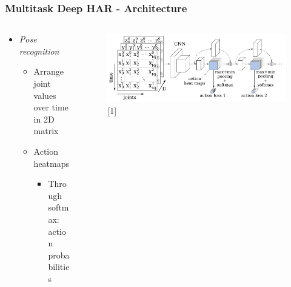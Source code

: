 \documentclass[9pt]{beamer}
\providecommand{\sourcefix}[1]{\\ \footnotesize \tugreen{Source:} [#1]}
\newenvironment{myframe}[1][]{%
\begin{frame}%
\frametitle{#1}
\setcounter{footnote}{0}


}{%
\end{frame}%
}
\begin{document}
\begin{myframe}[Multitask Deep HAR - Architecture]

	\begin{columns}[T]
        \begin{column}{.45\textwidth}
            \begin{itemize}
                \item \textit{Pose recognition}
                \begin{itemize}
                    \item Arrange joint values over time in 2D matrix
                    \item Action heatmaps
                    \begin{itemize}
                        \item Through softmax: action probabilities
                    \end{itemize}

                \end{itemize}
            \end{itemize}
        \end{column}
        \begin{column}{.45\textwidth}
            \begin{figure}
                \includegraphics[width=.99\textwidth]{jointsovertime.png}
                \sourcefix{1}
            \end{figure}
        \end{column}
	\end{columns}
\end{myframe}
\end{document}
